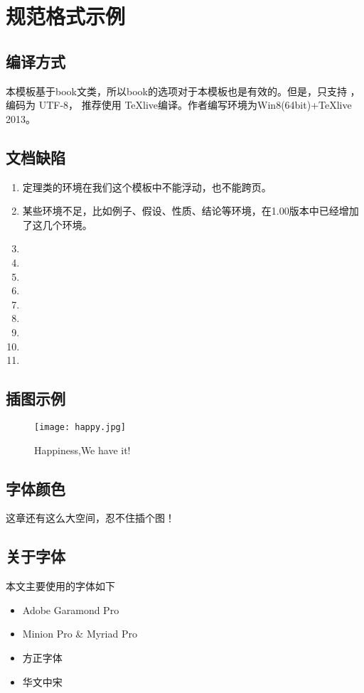 \documentclass[cyan]{elegantnote}
\author{刘通(LIU Tong) Ethan}
\begin{document}
\maketitle
\tableofcontents
\chapter{规范格式示例}

\section{编译方式}
本模板基于book文类，所以book的选项对于本模板也是有效的。但是，只支持 \XeLaTeX{}，编码为 UTF-8，
推荐使用 \TeX{}live编译。作者编写环境为Win8(64bit)+\TeX{}live 2013。

\section{文档缺陷}
\begin{enumerate}
\item 定理类的环境在我们这个模板中不能浮动，也不能跨页。
\item 某些环境不足，比如例子、假设、性质、结论等环境，在1.00版本中已经增加了这几个环境。
\item
\item
\item
\item
\item
\item
\item
\item
\item
\end{enumerate}

\section{插图示例}
\begin{figure}[H]
\centering
\texttt{[image: happy.jpg]}
\caption{Happiness,We have it!\label{figur:happy}}
\end{figure}

\section{字体颜色}
{\color{thid}这章还有这么大空间，忍不住插个图！}

\section{关于字体}
本文主要使用的字体如下
\begin{itemize}
\itemsep=3pt
\parskip=0pt
\item Adobe Garamond Pro
\item Minion Pro \& Myriad Pro
\item 方正字体
\item 华文中宋
\end{itemize}
\end{document}
